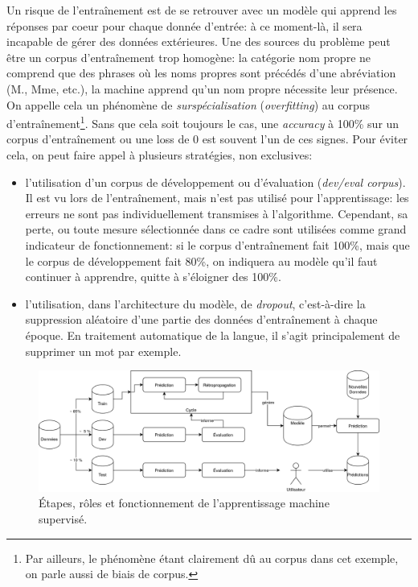 \label{deep-learning:overfitting}
Un risque de l'entraînement est de se retrouver avec un modèle qui apprend les réponses par coeur pour chaque donnée d'entrée: à ce moment-là, il sera incapable de gérer des données extérieures. Une des sources du problème peut être un corpus d'entraînement trop homogène: la catégorie nom propre ne comprend que des phrases où les noms propres sont précédés d'une abréviation (M., Mme, etc.), la machine apprend qu'un nom propre nécessite leur présence. On appelle cela un phénomène de \textit{surspécialisation} (\textit{overfitting}) au corpus d'entraînement\footnote{Par ailleurs, le phénomène étant clairement dû au corpus dans cet exemple, on parle aussi de biais de corpus.}. Sans que cela soit toujours le cas, une \textit{accuracy} à 100\% sur un corpus d'entraînement ou une loss de 0 est souvent l'un de ces signes. Pour éviter cela, on peut faire appel à plusieurs stratégies, non exclusives:
\begin{itemize}
    \item l'utilisation d'un corpus de développement ou d'évaluation (\textit{dev/eval corpus}). Il est vu lors de l'entraînement, mais n'est pas utilisé pour l'apprentissage: les erreurs ne sont pas individuellement transmises à l'algorithme. Cependant, sa perte, ou toute mesure sélectionnée dans ce cadre sont utilisées comme grand indicateur de fonctionnement: si le corpus d'entraînement fait 100\%, mais que le corpus de développement fait 80\%, on indiquera au modèle qu'il faut continuer à apprendre, quitte à s'éloigner des 100\%.
    \item l'utilisation, dans l'architecture du modèle, de \textit{dropout}, c'est-à-dire la suppression aléatoire d'une partie des données d'entraînement à chaque époque. En traitement automatique de la langue, il s'agit principalement de supprimer un mot par exemple.
\end{itemize}


\begin{figure}[h]
    \centering
    \includegraphics[width=\linewidth]{figures/chap2/MachineLearning.png}
    \caption{Étapes, rôles et fonctionnement de l'apprentissage machine supervisé.}
    \label{fig:deep-learning:fonctionnement}
\end{figure}


